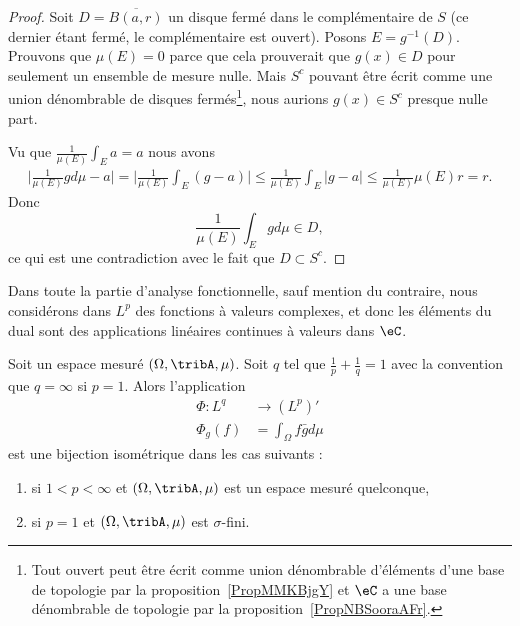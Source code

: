 \begin{proof}
    Soit \( D=\overline{ B(a,r) }\) un disque fermé dans le complémentaire de \( S\) (ce dernier étant fermé, le complémentaire est ouvert). Posons \( E=g^{-1}(D)\). Prouvons que \( \mu(E)=0\) parce que cela prouverait que \( g(x)\in D\) pour seulement un ensemble de mesure nulle. Mais \( S^c\) pouvant être écrit comme une union dénombrable de disques fermés\footnote{Tout ouvert peut être écrit comme union dénombrable d'éléments d'une base de topologie par la proposition~\ref{PropMMKBjgY} et $\eC$ a une base dénombrable de topologie par la proposition~\ref{PropNBSooraAFr}.}, nous aurions \( g(x)\in S^c\) presque nulle part.

    Vu que \( \frac{1}{ \mu(E) }\int_Ea=a\) nous avons
    \begin{subequations}
        \begin{align}
            \big| \frac{1}{ \mu(E) }gd\mu-a \big|=\big| \frac{1}{ \mu(E) }\int_E(g-a) \big|\leq  \frac{1}{ \mu(E) }\int_E| g-a |\leq\frac{1}{ \mu(E) }\mu(E)r=r.
        \end{align}
    \end{subequations}
    Donc
    \begin{equation}
        \frac{1}{ \mu(E) }\int_Egd\mu\in D,
    \end{equation}
    ce qui est une contradiction avec le fait que \( D\subset S^c\).
\end{proof}

Dans toute la partie d'analyse fonctionnelle, sauf mention du contraire, nous considérons dans \( L^p\) des fonctions à valeurs complexes, et donc les éléments du dual sont des applications linéaires continues à valeurs dans \( \eC\).

\begin{theorem}
                \label{ThoLPQPooPWBXuv}
    Soit un espace mesuré \( (\Omega,\tribA,\mu)\). Soit \( q\) tel que \( \frac{1}{ p }+\frac{1}{ q }=1\) avec la convention que \( q=\infty\) si \( p=1\). Alors l'application
    \begin{equation}
        \begin{aligned}
            \Phi\colon L^q&\to (L^p)' \\
            \Phi_g(f)&=\int_{\Omega}f\bar gd\mu
        \end{aligned}
    \end{equation}
    est une bijection isométrique dans les cas suivants :
    \begin{enumerate}
        \item       \label{ITEMooSQQBooWSFBmX}
            si \( 1<p<\infty\) et \( (\Omega,\tribA,\mu)\) est un espace mesuré quelconque,
        \item       \label{ITEMooCQGJooOWzjoV}
            si \( p=1\) et \( (\Omega,\tribA, \mu)\) est \( \sigma\)-fini.
    \end{enumerate}
\end{theorem}

